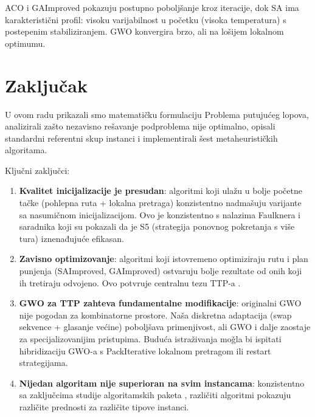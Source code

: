 \documentclass[12pt,a4paper]{article}
\begin{document}
ACO i GAImproved pokazuju postupno pobolj\v{s}anje kroz iteracije, dok SA ima karakteristi\v{c}ni profil: visoku varijabilnost u po\v{c}etku (visoka temperatura) s postepenim stabiliziranjem. GWO konvergira brzo, ali na lo\v{s}ijem lokalnom optimumu.

\section{Zaklju\v{c}ak}

U ovom radu prikazali smo matematičku formulaciju Problema putuju\'{c}eg lopova, analizirali zašto nezavisno re\v{s}avanje podproblema nije optimalno, opisali standardni referentni skup instanci i implementirali \v{s}est metaheuristi\v{c}kih algoritama.

Klju\v{c}ni zaklju\v{c}ci:
\begin{enumerate}
    \item \textbf{Kvalitet inicijalizacije je presudan}: algoritmi koji ulažu u bolje po\v{c}etne ta\v{c}ke (pohlepna ruta + lokalna pretraga) konzistentno nadma\v{s}uju varijante sa nasumi\v{c}nom inicijalizacijom. Ovo je konzistentno s nalazima Faulknera i saradnika \cite{faulkner2015} koji su pokazali da je S5 (strategija ponovnog pokretanja s vi\v{s}e tura) iznenađuju\'{c}e efikasan.
    \item \textbf{Zavisno optimizovanje}: algoritmi koji istovremeno optimiziraju rutu i plan punjenja (SAImproved, GAImproved) ostvaruju bolje rezultate od onih koji ih tretiraju odvojeno. Ovo potvr\dj{}uje centralnu tezu TTP-a \cite{bonyadi2013,mei2014}.
    \item \textbf{GWO za TTP zahteva fundamentalne modifikacije}: originalni GWO nije pogodan za kombinatorne prostore. Na\v{s}a diskretna adaptacija (swap sekvence + glasanje ve\'{c}ine) poboljšava primenjivost, ali GWO i dalje zaostaje za specijalizovanijim pristupima. Budu\'{c}a istra\v{z}ivanja mo\v{g}la bi ispitati hibridizaciju GWO-a s PackIterative lokalnom pretragom ili restart strategijama.
    \item \textbf{Nijedan algoritam nije superioran na svim instancama}: konzistentno sa zaklju\v{c}cima studije algoritamskih paketa \cite{wagner_selection}, razli\v{c}iti algoritmi pokazuju razli\v{c}ite prednosti za razli\v{c}ite tipove instanci.
\end{enumerate}
\end{document}
